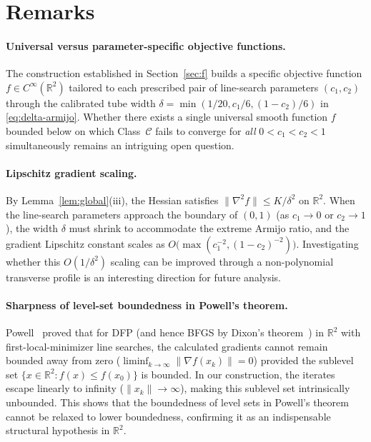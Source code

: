\documentclass[11pt]{article}
\newcommand{\R}{\mathbb{R}}
\begin{document}
\section{Remarks}
\label{sec:remarks}

\paragraph{Universal versus parameter-specific objective functions.}
The construction established in Section~\ref{sec:f} builds a specific objective function $f \in C^\infty(\R^2)$ tailored to each prescribed pair of line-search parameters $(c_1, c_2)$ through the calibrated tube width $\delta = \min(1/20, c_1/6, (1-c_2)/6)$ in \eqref{eq:delta-armijo}.
Whether there exists a single universal smooth function $f$ bounded below on which Class~$\mathcal C$ fails to converge for \emph{all} $0<c_1<c_2<1$ simultaneously remains an intriguing open question.

\paragraph{Lipschitz gradient scaling.}
By Lemma~\ref{lem:global}(iii), the Hessian satisfies $\|\nabla^2 f\| \le K/\delta^2$ on $\R^2$.
When the line-search parameters approach the boundary of $(0, 1)$ (as $c_1 \to 0$ or $c_2 \to 1$), the width $\delta$ must shrink to accommodate the extreme Armijo ratio, and the gradient Lipschitz constant scales as $O\bigl(\max(c_1^{-2}, (1-c_2)^{-2})\bigr)$.
Investigating whether this $O(1/\delta^2)$ scaling can be improved through a non-polynomial transverse profile is an interesting direction for future analysis.

\paragraph{Sharpness of level-set boundedness in Powell's theorem.}
Powell~\cite{powell2000} proved that for DFP (and hence BFGS by Dixon's theorem~\cite{dixon1972}) in $\R^2$ with first-local-minimizer line searches, the calculated gradients cannot remain bounded away from zero ($\liminf_{k\to\infty} \|\nabla f(x_k)\| = 0$) provided the sublevel set $\{x \in \R^2 : f(x) \le f(x_0)\}$ is bounded.
In our construction, the iterates escape linearly to infinity ($\|x_k\| \to \infty$), making this sublevel set intrinsically unbounded.
This shows that the boundedness of level sets in Powell's theorem cannot be relaxed to lower boundedness, confirming it as an indispensable structural hypothesis in $\R^2$.
\end{document}
